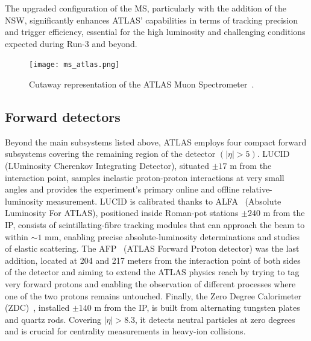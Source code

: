 The upgraded configuration of the MS, particularly with the addition of the NSW, significantly enhances ATLAS' capabilities in terms of tracking precision and trigger efficiency, essential for the high luminosity and challenging conditions expected during Run-3 and beyond.


\begin{figure}[htbp]
    \centering
        \texttt{[image: ms\_atlas.png]}
    \caption{Cutaway representation of the ATLAS Muon Spectrometer~\cite{ATLAS_run3}.}
    \label{fig:ms_atlas}
\end{figure}

\subsection{Forward detectors}
\label{sec:fwd}

Beyond the main subsystems listed above, ATLAS employs four compact forward subsystems covering the remaining region of the detector $(|\eta| > 5)$.
LUCID~\cite{Jenni:721908} (LUminosity Cherenkov Integrating Detector), situated $\pm17$ m from the interaction point, samples inelastic proton-proton interactions at very small angles and provides the experiment’s primary online and offline relative-luminosity measurement.  
LUCID is calibrated thanks to ALFA~\cite{Khalek_2016} (Absolute Luminosity For ATLAS), positioned inside Roman-pot stations $\pm240$ m from the IP, consists of scintillating-fibre tracking modules that can approach the beam to within $\sim\!1$ mm, enabling precise absolute-luminosity determinations and studies of elastic scattering.  
The AFP~\cite{Adamczyk:2015cjy} (ATLAS Forward Proton detector) was the last addition, located at 204 and 217 meters from the interaction point of both sides of the detector and aiming to extend the ATLAS physics reach by trying to tag very forward protons and enabling the observation of different processes where one of the two protons remains untouched.
Finally, the Zero Degree Calorimeter (ZDC)~\cite{Jenni:1009649}, installed $\pm140$ m from the IP, is built from alternating tungsten plates and quartz rods.  Covering $|\eta| > 8.3$, it detects neutral particles at zero degrees and is crucial for centrality measurements in heavy-ion collisions.

